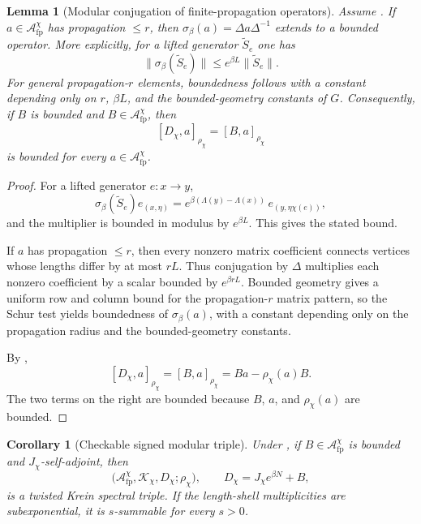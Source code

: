 \documentclass[11pt]{article}
\newtheorem{lemma}[theorem]{Lemma}
\newtheorem{corollary}[theorem]{Corollary}
\theoremstyle{definition}
\theoremstyle{remark}
\newcommand{\Kh}{\mathcal{K}}
\begin{document}
\begin{lemma}[Modular conjugation of finite-propagation operators]
\label{lem:bounded-twisted}
Assume .  If $a\in\mathcal A_{\mathrm{fp}}^\chi$
has propagation $\le r$, then $\sigma_\beta(a)=\Delta a\Delta^{-1}$ extends to
a bounded operator.  More explicitly, for a lifted generator
$\widetilde S_e$ one has
\[
  \|\sigma_\beta(\widetilde S_e)\|\le e^{\beta L}\|\widetilde S_e\|.
\]
For general propagation-$r$ elements, boundedness follows with a constant
depending only on $r$, $\beta L$, and the bounded-geometry constants of $G$.
Consequently, if $B$ is bounded and $B\in\mathcal A_{\mathrm{fp}}^\chi$, then
\[
  [D_\chi,a]_{\rho_\chi}=[B,a]_{\rho_\chi}
\]
is bounded for every $a\in\mathcal A_{\mathrm{fp}}^\chi$.
\end{lemma}

\begin{proof}
For a lifted generator $e:x\to y$,
\[
  \sigma_\beta(\widetilde S_e)e_{(x,\eta)}
  =e^{\beta(\Lambda(y)-\Lambda(x))}\,
    e_{(y,\eta\chi(e))},
\]
and the multiplier is bounded in modulus by $e^{\beta L}$.  This gives the
stated bound.

If $a$ has propagation $\le r$, then every nonzero matrix coefficient connects
vertices whose lengths differ by at most $rL$.  Thus conjugation by $\Delta$
multiplies each nonzero coefficient by a scalar bounded by $e^{\beta rL}$.
Bounded geometry gives a uniform row and column bound for the propagation-$r$
matrix pattern, so the Schur test yields boundedness of $\sigma_\beta(a)$, with
a constant depending only on the propagation radius and the bounded-geometry
constants.

By ,
\[
  [D_\chi,a]_{\rho_\chi}=[B,a]_{\rho_\chi}
  =Ba-\rho_\chi(a)B .
\]
The two terms on the right are bounded because $B$, $a$, and $\rho_\chi(a)$ are
bounded.
\end{proof}

\begin{corollary}[Checkable signed modular triple]
\label{cor:checkable-signed-triple}
Under , if $B\in\mathcal A_{\mathrm{fp}}^\chi$
is bounded and $J_\chi$-self-adjoint, then
\[
  \bigl(\mathcal A_{\mathrm{fp}}^\chi,\Kh_\chi,D_\chi;\rho_\chi\bigr),
  \qquad
  D_\chi=J_\chi e^{\beta N}+B,
\]
is a twisted Krein spectral triple.  If the length-shell multiplicities are
subexponential, it is $s$-summable for every $s>0$.
\end{corollary}
\end{document}
